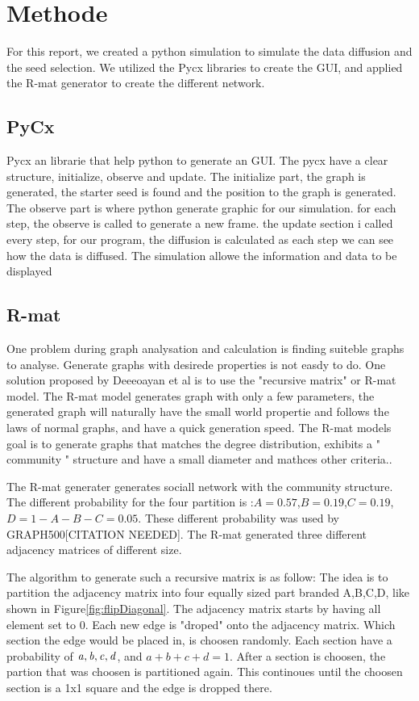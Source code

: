 \chapter{Methode}
For this report, we created a python simulation to simulate the data diffusion and the seed selection. We utilized the Pycx libraries to create the GUI, and applied the R-mat generator to create the different network.

\section{PyCx}
Pycx an librarie that help python to generate an GUI\cite{Pycx}. The pycx have a clear structure, initialize, observe and update. The initialize part, the graph is generated, the starter seed is found and the position to the graph is generated. The observe part is where python generate graphic for our simulation. for each step, the observe is called to generate a new frame. the update section i called every step, for our program, the diffusion is calculated as each step we can see how the data is diffused. The simulation allowe the information and data to be displayed 


\section{R-mat}
One problem during graph analysation and calculation is finding suiteble graphs to analyse. Generate graphs with desirede properties is not easdy to do. One solution proposed by Deeeoayan et al is to use the "recursive matrix" or R-mat model. The R-mat model generates graph with only a few parameters, the generated graph will naturally have the small world propertie and follows the laws of normal graphs, and have a quick generation speed\cite{Rmat2004}. The R-mat models goal is to generate graphs that matches the degree distribution, exhibits a " community " structure and have a small diameter and mathces other criteria.\cite{Rmat2004}.

The R-mat generater generates sociall network with the community structure. The different probability for the four partition is :$A=0.57$,$B=0.19$,$C=0.19$,$D = 1-A-B-C = 0.05$. These different probability was used by GRAPH500[CITATION NEEDED]. The R-mat generated three different adjacency matrices of different size.


The algorithm to generate such a recursive matrix is as follow: The idea is to partition the adjacency matrix into four equally sized part branded A,B,C,D, like shown in Figure\ref{fig:flipDiagonal}. The adjacency matrix starts by having all element set to 0. Each new edge is "droped" onto the adjacency matrix. Which section the edge would be placed in, is choosen randomly. Each section have a probability of $\it{a, b, c, d}$, and $a + b + c + d = 1$. After a section is choosen, the partion that was choosen is partitioned again. This continoues until the choosen section is a 1x1 square and the edge is dropped there. 

